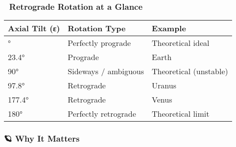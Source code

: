 \documentclass[
  letterpaper,
]{book}
\begin{document}
\subsubsection{\texorpdfstring{📌 \textbf{Retrograde Rotation at a
Glance}}{📌 Retrograde Rotation at a Glance}}\label{retrograde-rotation-at-a-glance}

\begin{longtable}[]{@{}lll@{}}
\toprule\noalign{}
\textbf{Axial Tilt (ε)} & \textbf{Rotation Type} & \textbf{Example} \\
\midrule\noalign{}
\endhead
\bottomrule\noalign{}
\endlastfoot
0° & Perfectly prograde & Theoretical ideal \\
23.4° & Prograde & Earth \\
90° & Sideways / ambiguous & Theoretical (unstable) \\
97.8° & Retrograde & Uranus \\
177.4° & Retrograde & Venus \\
180° & Perfectly retrograde & Theoretical limit \\
\end{longtable}

\subsubsection{\texorpdfstring{🪐 \textbf{Why It
Matters}}{🪐 Why It Matters}}\label{why-it-matters}
\end{document}
